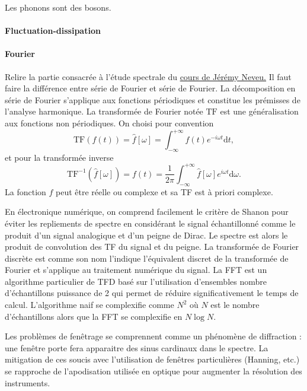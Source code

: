 \documentclass[12pt,a4paper]{article}
\renewcommand{\d}{\mathrm{d}}
\newcommand{\tf}{\mathrm{TF}}
\begin{document}
Les phonons sont des bosons.

\paragraph{Fluctuation-dissipation\\}

\paragraph{Fourier\\}
Relire la partie consacrée à l'étude spectrale du \href{https://gitlab.in2p3.fr/Jeremy/Electronique/-/blob/master/Cours/electronique.pdf}{cours de Jérémy Neveu.}
Il faut faire la différence entre série de Fourier et série de Fourier.
La décomposition en série de Fourier s'applique aux fonctions périodiques et constitue les prémisses de l'analyse harmonique.
La transformée de Fourier notée $\tf$ est une généralisation aux fonctions non périodiques.
On choisi pour convention 
\begin{equation}
\tf (f(t)) = \hat{f}[\omega] = \int_{-\infty}^{+\infty} f(t) e^{-i\omega t} \d t,
\end{equation}
et pour la transformée inverse
\begin{equation}
\tf^{-1} (\hat{f}[\omega]) = f(t) = \frac{1}{2\pi}\int_{-\infty}^{+\infty} \hat{f}[\omega] e^{i\omega t} \d \omega.
\end{equation}
La fonction $f$ peut être réelle ou complexe et sa TF est à priori complexe.

En électronique numérique, on comprend facilement le critère de Shanon pour éviter les repliements de spectre en considérant le signal échantillonné comme le produit d'un signal analogique et d'un peigne de Dirac.
Le spectre est alors le produit de convolution des TF du signal et du peigne.
La transformée de Fourier discrète est comme son nom l'indique l'équivalent discret de la transformée de Fourier et s'applique au traitement numérique du signal.
La FFT est un algorithme particulier de TFD basé sur l'utilisation d'ensembles nombre d'échantillons puissance de 2 qui permet de réduire significativement le temps de calcul.
L'algorithme naif se complexifie comme $N^2$ où $N$ est le nombre d'échantillons alors que la FFT se complexifie en $N\log N$.

Les problèmes de fenêtrage se comprennent comme un phénomène de diffraction : une fenêtre porte fera apparaitre des sinus cardinaux dans le spectre.
La mitigation de ces soucis avec l'utilisation de fenêtres particulières (Hanning, etc.) se rapproche de l'apodisation utilisée en optique pour augmenter la résolution des instruments.
\end{document}
